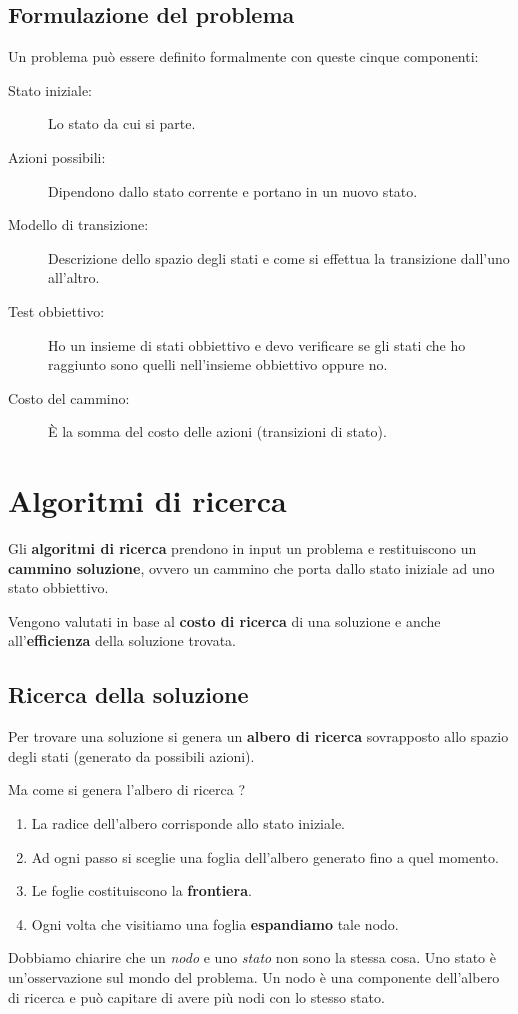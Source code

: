 \subsection{Formulazione del problema}
Un problema pu\`o essere definito formalmente con queste cinque componenti:
\begin{description}
	\item[Stato iniziale:] Lo stato da cui si parte.
	\item[Azioni possibili:] Dipendono dallo stato corrente e portano in un nuovo stato.
	\item[Modello di transizione:] Descrizione dello spazio degli stati e come si effettua
	      la transizione dall'uno all'altro.
	\item[Test obbiettivo:] Ho un insieme di stati obbiettivo e devo verificare se gli stati
	      che ho raggiunto sono quelli nell'insieme obbiettivo oppure no.
	\item[Costo del cammino:] \`E la somma del costo delle azioni (transizioni di stato).
\end{description}

\section{Algoritmi di ricerca}
Gli \textbf{algoritmi di ricerca} prendono in input un problema e restituiscono un
\textbf{cammino soluzione}, ovvero un cammino che porta dallo stato iniziale ad uno stato
obbiettivo.

Vengono valutati in base al \textbf{costo di ricerca} di una soluzione e anche
all'\textbf{efficienza} della soluzione trovata.

\subsection{Ricerca della soluzione}
Per trovare una soluzione si genera un \textbf{albero di ricerca} sovrapposto allo spazio
degli stati (generato da possibili azioni).

Ma come si genera l'albero di ricerca ?
\begin{enumerate}
	\item La radice dell'albero corrisponde allo stato iniziale.
	\item Ad ogni passo si sceglie una foglia dell'albero generato fino a quel momento.
	\item Le foglie costituiscono la \textbf{frontiera}.
	\item Ogni volta che visitiamo una foglia \textbf{espandiamo} tale nodo.
\end{enumerate}
Dobbiamo chiarire che un \emph{nodo} e uno \emph{stato} non sono la stessa cosa. Uno stato
\`e un'osservazione sul mondo del problema. Un nodo \`e una componente dell'albero di
ricerca e pu\`o capitare di avere pi\`u nodi con lo stesso stato.

